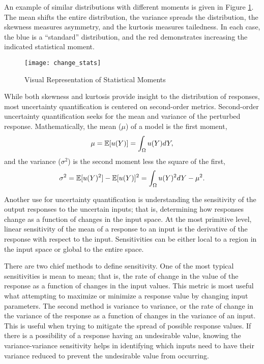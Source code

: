 An example of similar distributions with different moments is
given in Figure \ref{fig:change moments}.  The mean shifts the entire distribution, the variance spreads the
distribution, the skewness measures asymmetry, and the kurtosis measures tailedness.  In each case, the blue
is a ``standard'' distribution, and the red demonstrates increasing the indicated statistical moment.
\begin{figure}[H]
  \centering
  \texttt{[image: change\_stats]}
  \caption{Visual Representation of Statistical Moments}
  \label{fig:change moments}
\end{figure}

While both skewness and kurtosis provide insight to the distribution of responses,
most uncertainty quantification is centered on second-order metrics.
Second-order uncertainty quantification seeks for the mean and variance of
the perturbed response.  Mathematically, the mean ($\mu$) of a model is the first moment,
\begin{equation}
  \mu = \mathbb{E}[ u(Y)] = \int_\Omega u(Y) dY,
\end{equation}
and the variance ($\sigma^2$) is the second moment less the square of the first,
\begin{equation}
  \sigma^2 = \mathbb{E}[ u(Y)^2] - \mathbb{E}[ u(Y)]^2 = \int_\Omega u(Y)^2 dY - \mu^2.
\end{equation}
 
Another use for uncertainty quantification is understanding the sensitivity of the output responses to the
uncertain inputs; that is, determining how responses change as a function of changes in the input space.  At
the most primitive level, linear sensitivity of the mean of a response to an input is the derivative of the response
with respect to the input.  Sensitivities can be either local to a region in the input space or global
to the entire space.

There are two chief methods to define sensitivity.  One of the most typical sensitivities
is mean to mean; that is, the rate of change in the value of the response as a function of changes in the
input values.  This metric is most useful what attempting to maximize or minimize a response value by changing
input parameters.  The second method is variance to variance, or the rate of change in the variance of the
response as a function of changes in the variance of an input.  This is useful when trying to mitigate the
spread of possible response values.  If there is a possibility of a response having an undesirable value,
knowing the variance-variance sensitivity helps in identifying which inputs need to have their variance
reduced to prevent the undesirable value from occurring.

